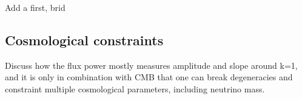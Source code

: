 Add a first, brid

\subsection{Cosmological constraints}

Discuss how the flux power mostly measures amplitude and slope around k=1, and 
it is only in combination with CMB that one can break degeneracies and 
constraint multiple cosmological parameters, including neutrino mass. 


